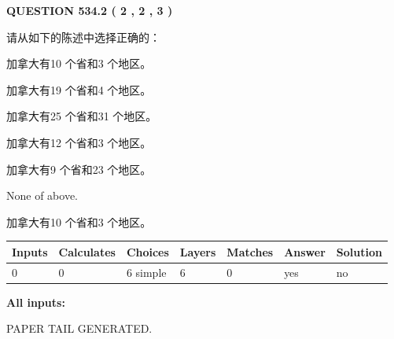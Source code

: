 \documentclass{ctexart}
\begin{document}
   
  
\vspace{0.2in}
  
{\textbf{\Large{QUESTION
534.2 
 ( 2 , 2 , 3 )
}}}
  
  
请从如下的陈述中选择正确的：
 
 
加拿大有10 个省和3 个地区。
 
 
加拿大有19 个省和4 个地区。
 
 
加拿大有25 个省和31 个地区。
 
 
加拿大有12 个省和3 个地区。
 
 
加拿大有9 个省和23 个地区。
 
 
 None of above.
 
 
\noindent{}
 
 
加拿大有10 个省和3 个地区。
 
 
\noindent{}
 
 
   
   
   
   
\noindent\begin{tabular}{|l|l|l|l|l|l|l|}
 \hline
Inputs & Calculates & Choices & Layers & Matches & Answer & Solution \\ \hline
 0  & 
 0  & 
 6
  simple  
  & 
 6  & 
 0  & 
  yes & 
  no 
  \\ \hline
 \end{tabular}
   
   
   
   
\noindent{}
   
   
   
   
\noindent\vspace{0.1in}\hspace{-0.08in} {\textbf{\Large{All inputs: }}}
   
   
   
   
   
   
 \vspace{0.2in}
 
   
   
\vspace{2.0in} PAPER TAIL GENERATED.
   
\end{document}
